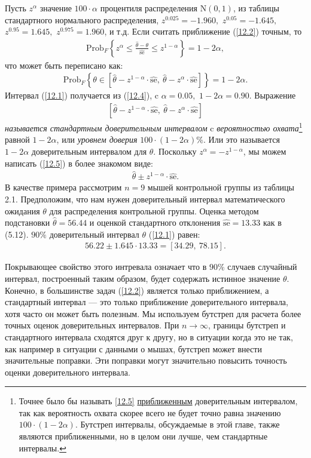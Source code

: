 Пусть $z^{\alpha}$ значение $100\cdot \alpha$ процентиля распределения $\mathrm{N}(0,1)$, из таблицы стандартного нормального распределения, $z^{0.025} = -1.960,$  $z^{0.05} = -1.645,$ $z^{0.95} = 1.645,$ $z^{0.975} = 1.960$, и т.д.
Если считать приближение (\ref{12.2}) точным, то
\begin{gather}\label{12.3}
\text{Prob}_{F} \left \{ z^{\alpha} \le \frac{\widehat{\theta} - \theta}{\widehat{\text{se}}} \le z^{1 - \alpha }\right\} = 1 - 2 \alpha,
\end{gather}
что может быть переписано как:
\begin{gather}\label{12.4}
\text{Prob}_{F}\left\{ \theta \in [ \widehat{\theta} - z^{1 - \alpha } \cdot \widehat{\text{se}}, \ \widehat{\theta} - z^{\alpha } \cdot \widehat{\text{se}} ] \right\} = 1 - 2 \alpha.
\end{gather}
Интервал (\ref{12.1}) получается из (\ref{12.4}), c $\alpha = 0.05,$ $1 - 2 \alpha = 0.90.$ Выражение
\begin{gather}\label{12.5}
[ \widehat{\theta} - z^{1 - \alpha } \cdot \widehat{\text{se}},\ \widehat{\theta} - z^{\alpha} \cdot \widehat{\text{se}}]
\end{gather}
\textit{называется стандартным доверительным интервалом} c \textit{вероятностью охвата}\footnote{Точнее было бы называть \ref{12.5} \underline{приближенным} доверительным интервалом, так как вероятность охвата скорее всего не будет точно равна значению $100 \cdot(1 - 2 \alpha)$. Бутстреп интервалы, обсуждаемые в этой главе, также являются приближенными, но в целом они лучше, чем стандартные интервалы.} равной $1 - 2 \alpha$, или \textit{уровнем доверия} $100 \cdot(1 - 2 \alpha) \%$. Или это называется $1 - 2 \alpha$ доверительным интервалом для $\theta$. Поскольку $ z^{\alpha } = -z^{1 - \alpha}$, мы можем написать (\ref{12.5}) в более знакомом виде:
\begin{gather}\label{12.6}
\widehat{\theta} \pm z^{1 - \alpha} \cdot \widehat{\text{se}}.
\end{gather}
В качестве примера рассмотрим $n = 9$ мышей контрольной группы из таблицы 2.1. Предположим, что нам нужен доверительный интервал математического ожидания $\theta$ для распределения контрольной группы. Оценка методом подстановки $\widehat{\theta} = 56.44$ и оценкой стандартного отклонения $\widehat{\text{se}} = 13.33 $ как в (5.12). $90 \%$ доверительный интервал $\theta$ (\ref{12.1}) равен:
\begin{gather}\label{12.7}
56.22 \pm 1.645\cdot 13.33 = [34.29,\ 78.15].
\end{gather}

Покрывающее свойство этого интревала означает что в $90\% $ случаев случайный интервал, построенный таким образом, будет содержать истинное значение $\theta.$ Конечно, в большинстве задач (\ref{12.2}) является только приближением, а стандартный интервал --- это только приближение доверительного интервала, хотя часто он может быть полезным. Мы используем бутстреп для расчета более точных оценок доверительных интервалов. При $n \rightarrow \infty$, границы бутстреп и стандартного интервала сходятся друг к другу, но в ситуации когда это не так, как например в ситуации с данными о мышах, бутстреп может внести значительные поправки. Эти поправки могут значительно повысить точность оценки доверительного интервала. 